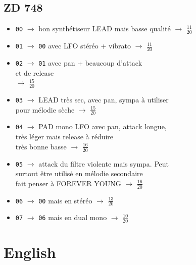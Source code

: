 \documentclass[a4paper, 13pt]{article}
\begin{document}
\vspace{1cm}
\subsection*{ZD 748}
\begin{itemize}
    \item \texttt{00} $\rightarrow$ bon synthétiseur LEAD mais basse qualité $\rightarrow$ \Large{$\frac{11}{20}$} \normalsize \vspace{0.2cm}
    \item \texttt{01} $\rightarrow$ \texttt{00} avec LFO stéréo + vibrato $\rightarrow$ \Large{$\frac{11}{20}$} \normalsize \vspace{0.2cm}
    \item \texttt{02} $\rightarrow$ \texttt{01} avec pan + beaucoup d'attack \\ et de release \\ $\rightarrow$ \Large{$\frac{15}{20}$} \normalsize \vspace{0.2cm}
    \item \texttt{03} $\rightarrow$ LEAD très sec, avec pan, sympa à utiliser \\ pour mélodie sèche $\rightarrow$ \Large{$\frac{15}{20}$} \normalsize \vspace{0.2cm}
    \item \texttt{04} $\rightarrow$ PAD mono LFO avec pan, attack longue, \\très léger mais release à réduire \\très bonne basse $\rightarrow$ \Large{$\frac{16}{20}$} \normalsize \vspace{0.2cm}
    \item \texttt{05} $\rightarrow$ attack du filtre violente mais sympa. Peut \\surtout être utilisé en mélodie secondaire \\ fait penser à FOREVER YOUNG $\rightarrow$ \Large{$\frac{16}{20}$} \normalsize \vspace{0.2cm}
    \item \texttt{06} $\rightarrow$ \texttt{00} mais en stéréo $\rightarrow$ \Large{$\frac{13}{20}$} \normalsize \vspace{0.2cm}
    \item \texttt{07} $\rightarrow$ \texttt{06} mais en dual mono $\rightarrow$ \Large{$\frac{10}{20}$} \normalsize \vspace{0.2cm}
\end{itemize}


\vspace{1cm}
\section*{English}
\end{document}
